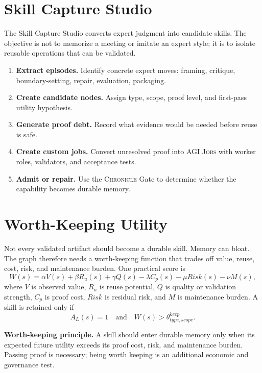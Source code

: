 \documentclass[10.5pt]{article}
\theoremstyle{goThm}
\newcommand{\chronicle}{\textsc{Chronicle}}
\newcommand{\jobs}{\textsc{AGI Jobs}}
\begin{document}
\section{Skill Capture Studio}
The Skill Capture Studio converts expert judgment into candidate skills. The objective is not to memorize a meeting or imitate an expert style; it is to isolate reusable operations that can be validated.

\begin{enumerate}[label=\textbf{S\arabic*.}]
  \item \textbf{Extract episodes.} Identify concrete expert moves: framing, critique, boundary-setting, repair, evaluation, packaging.
  \item \textbf{Create candidate nodes.} Assign type, scope, proof level, and first-pass utility hypothesis.
  \item \textbf{Generate proof debt.} Record what evidence would be needed before reuse is safe.
  \item \textbf{Create custom jobs.} Convert unresolved proof into \jobs{} with worker roles, validators, and acceptance tests.
  \item \textbf{Admit or repair.} Use the \chronicle{} Gate to determine whether the capability becomes durable memory.
\end{enumerate}

\section{Worth-Keeping Utility}
Not every validated artifact should become a durable skill. Memory can bloat. The graph therefore needs a worth-keeping function that trades off value, reuse, cost, risk, and maintenance burden. One practical score is
\begin{equation}
W(s) = \alpha V(s) + \beta R_u(s) + \gamma Q(s) - \lambda C_p(s) - \mu Risk(s) - \nu M(s),
\end{equation}
where \(V\) is observed value, \(R_u\) is reuse potential, \(Q\) is quality or validation strength, \(C_p\) is proof cost, \(Risk\) is residual risk, and \(M\) is maintenance burden. A skill is retained only if
\begin{equation}
A_L(s)=1 \quad \text{and} \quad W(s) > \theta^{keep}_{type,scope}.
\end{equation}

\begin{policybox}
\textbf{Worth-keeping principle.} A skill should enter durable memory only when its expected future utility exceeds its proof cost, risk, and maintenance burden. Passing proof is necessary; being worth keeping is an additional economic and governance test.
\end{policybox}
\end{document}
